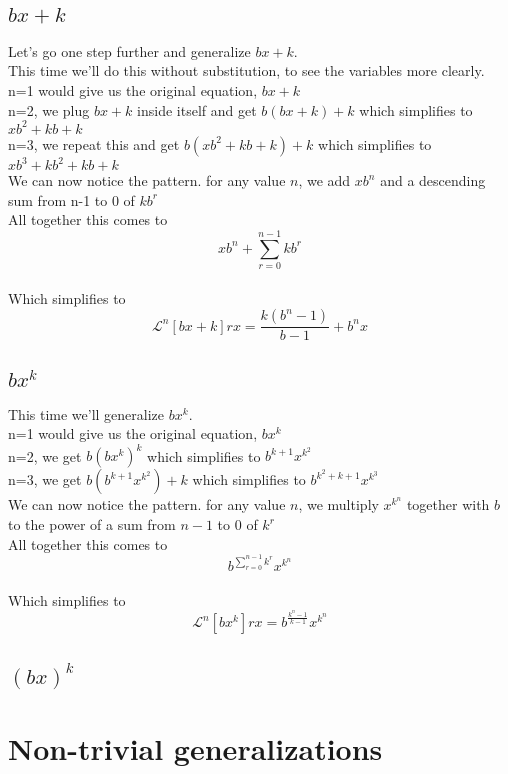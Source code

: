\documentclass[10pt, letterpaper]{article}
\begin{document}
\subsection{$bx+k$}
Let's go one step further and generalize {$bx+k$}.
\\This time we'll do this without substitution, to see the variables more clearly.
\\n=1 would give us the original equation, {$bx+k$}
\\n=2, we plug {$bx+k$} inside itself and get {$b(bx+k)+k$} which simplifies to {$xb^{2}+kb+k$}
\\n=3, we repeat this and get {$b(xb^{2}+kb+k)+k$} which simplifies to {$xb^{3} + kb^{2} + kb + k$}
\\We can now notice the pattern. for any value {$n$}, we add {$xb^{n}$} and a descending sum from n-1 to 0 of {$kb^{r}$}
\\All together this comes to $$xb^{n}+\sum_{r=0}^{n-1} kb^{r}$$ %
\\Which simplifies to
$$\mathscr{L}^n [bx+k] rx = \frac{k(b^{n}-1)}{b-1}+b^{n}x$$

\subsection{$bx^k$}
This time we'll generalize {$bx^k$}.
\\n=1 would give us the original equation, {$bx^{k}$}
\\n=2, we get {$b(bx^{k})^{k}$} which simplifies to {$b^{k+1}x^{k^{2}}$}
\\n=3, we get {$b(b^{k+1}x^{k^{2}})+k$} which simplifies to {$b^{k^{2} + k + 1} x^{k^{3}}$}
\\We can now notice the pattern. for any value {$n$}, we multiply {$x^{k^{n}}$} together with {$b$} to the power of a sum from {$n-1$} to {$0$} of {$k^{r}$}
\\All together this comes to $$b^{\sum_{r=0}^{n-1} k^{r}} x^{k^{n}}$$
\\Which simplifies to
$$\mathscr{L}^n [bx^k] rx = b^{\frac{k^{n}-1}{k-1}}x^{k^{n}}$$

\subsection{$(bx)^k$}

\newpage
\section{Non-trivial generalizations}
\end{document}

